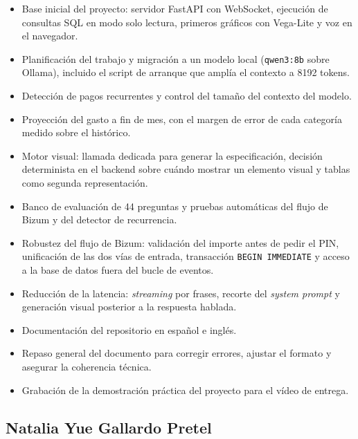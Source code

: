 \begin{itemize}
    \item Base inicial del proyecto: servidor FastAPI con WebSocket, ejecución
    de consultas SQL en modo solo lectura, primeros gráficos con Vega-Lite y
    voz en el navegador.
    \item Planificación del trabajo y migración a un modelo local
    (\texttt{qwen3:8b} sobre Ollama), incluido el script de arranque que amplía
    el contexto a 8192 tokens.
    \item Detección de pagos recurrentes y control del tamaño del contexto del
    modelo.
    \item Proyección del gasto a fin de mes, con el margen de error de cada
    categoría medido sobre el histórico.
    \item Motor visual: llamada dedicada para generar la especificación,
    decisión determinista en el backend sobre cuándo mostrar un elemento visual
    y tablas como segunda representación.
    \item Banco de evaluación de 44 preguntas y pruebas automáticas del flujo
    de Bizum y del detector de recurrencia.
    \item Robustez del flujo de Bizum: validación del importe antes de pedir el
    PIN, unificación de las dos vías de entrada, transacción
    \texttt{BEGIN IMMEDIATE} y acceso a la base de datos fuera del bucle de
    eventos.
    \item Reducción de la latencia: \textit{streaming} por frases, recorte del
    \textit{system prompt} y generación visual posterior a la respuesta hablada.
    \item Documentación del repositorio en español e inglés.

    \item Repaso general del documento para corregir errores, ajustar el formato y asegurar la coherencia técnica.

    \item Grabación de la demostración práctica del proyecto para el vídeo de entrega.
\end{itemize}

\subsection{Natalia Yue Gallardo Pretel}

